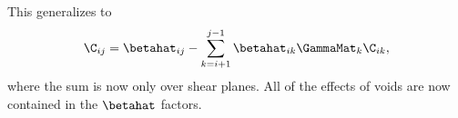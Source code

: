 This generalizes to 
\begin{equation}
\C_{i j} = \betahat_{i j} - \sum\limits_{k = i +1}^{j - 1} \betahat_{i k} \GammaMat_k \C_{i k},
\end{equation}
where the sum is now only over shear planes. All of the effects of voids are now contained in the $\betahat$ factors. 
  
  